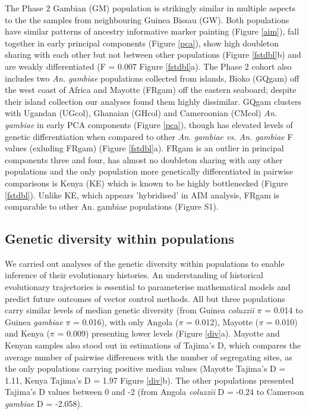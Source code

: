 \documentclass[a4paper,11pt,abstracton,hidelinks]{scrartcl}
\begin{document}
%
The Phase 2 Gambian (GM) population is strikingly similar in multiple aspects to the the samples from neighbouring Guinea Bissau (GW).
%
Both populations have similar patterns of ancestry informative marker painting (Figure \ref{aim}), fall together in early principal components (Figure \ref{pca}), show high doubleton sharing with each other but not between other populations (Figure \ref{fstdbl}b) and are weakly differentiated (F = 0.007 Figure \ref{fstdbl}a).
%
The Phase 2 cohort also includes two \textit{An. gambiae} populations collected from islands, Bioko (GQgam) off the west coast of Africa and Mayotte (FRgam) off the eastern seaboard; despite their island collection our analyses found them highly dissimilar. 
%
GQgam clusters with Ugandan (UGcol), Ghanaian (GHcol) and Cameroonian (CMcol) \textit{An. gambiae} in early PCA components (Figure \ref{pca}), though has elevated levels of genetic differentiation when compared to other 
\textit{An. gambiae vs. An. gambiae} F values (exluding FRgam) (Figure \ref{fstdbl}a). 
%
FRgam is an outlier in principal components three and four, has almost no doubleton sharing with any other populations and the only population more genetically differentiated in pairwise comparisons is Kenya (KE) which is known to be highly bottlenecked \cite{Ag1000gConsortium2017} (Figure \ref{fstdbl}).
% 
Unlike KE, which appears 'hybridised' in AIM analysis, FRgam is comparable to other An. gambiae populations (Figure S1).


\subsection*{Genetic diversity within populations}

We carried out analyses of the genetic diversity within populations to enable inference of their evolutionary histories.
%
An understanding of historical evolutionary trajectories is essential to parameterise mathematical models and predict future outcomes of vector control methods.
%
%
All but three populations carry similar levels of median genetic diversity (from Guinea \textit{coluzzii} $\pi$ = 0.014 to Guinea \textit{gambiae} $\pi$ = 0.016), with only Angola ($\pi$ = 0.012), Mayotte ($\pi$ = 0.010) and Kenya ($\pi$ = 0.009) presenting lower levels (Figure \ref{div}a).
%
Mayotte and Kenyan samples also stood out in estimations of Tajima's D, which compares the average number of pairwise differences with the number of segregating sites, as the only populations carrying positive median values  (Mayotte Tajima's D = 1.11, Kenya Tajima's D = 1.97 Figure \ref{div}b).
%
The other populations presented Tajima's D values between 0 and -2 (from Angola \textit{coluzzii} D = -0.24 to Cameroon \textit{gambiae} D = -2.058).
\end{document}
